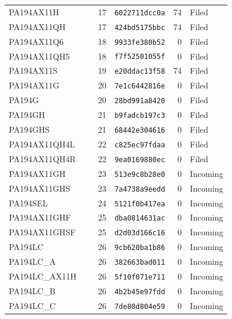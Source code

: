 \begin{longtable}{@{}>{\raggedright\arraybackslash}p{0.40\linewidth}r>{\raggedright\arraybackslash}p{0.22\linewidth}r>{\raggedright\arraybackslash}p{0.13\linewidth}@{}}
PA194AX11H & 17 & \texttt{6022711dcc0a} & 74 & Filed\\
PA194AX11QH & 17 & \texttt{424bd5175bbc} & 74 & Filed\\
PA194AX11Q6 & 18 & \texttt{9933fe380b52} & 0 & Filed\\
PA194AX11QH5 & 18 & \texttt{f7f52501055f} & 0 & Filed\\
PA194AX11S & 19 & \texttt{e20ddac13f58} & 74 & Filed\\
PA194AX11G & 20 & \texttt{7e1c6442816e} & 0 & Filed\\
PA194G & 20 & \texttt{28bd991a8420} & 0 & Filed\\
PA194GH & 21 & \texttt{b9fadcb197c3} & 0 & Filed\\
PA194GHS & 21 & \texttt{68442e304616} & 0 & Filed\\
PA194AX11QH4L & 22 & \texttt{c825ec97fdaa} & 0 & Filed\\
PA194AX11QH4R & 22 & \texttt{9ea0169880ec} & 0 & Filed\\
PA194AX11GH & 23 & \texttt{513e9c8b28e0} & 0 & Incoming\\
PA194AX11GHS & 23 & \texttt{7a4738a9eedd} & 0 & Incoming\\
PA194SEL & 24 & \texttt{5121f0b417ea} & 0 & Incoming\\
PA194AX11GHF & 25 & \texttt{dba0814631ac} & 0 & Incoming\\
PA194AX11GHSF & 25 & \texttt{d2d03d166c16} & 0 & Incoming\\
PA194LC & 26 & \texttt{9cb620ba1b86} & 0 & Incoming\\
PA194LC\_A & 26 & \texttt{382663bad011} & 0 & Incoming\\
PA194LC\_AX11H & 26 & \texttt{5f10f071e711} & 0 & Incoming\\
PA194LC\_B & 26 & \texttt{4b2b45e97fdd} & 0 & Incoming\\
PA194LC\_C & 26 & \texttt{7de80d804e59} & 0 & Incoming\\
\bottomrule\end{longtable}
\endgroup
